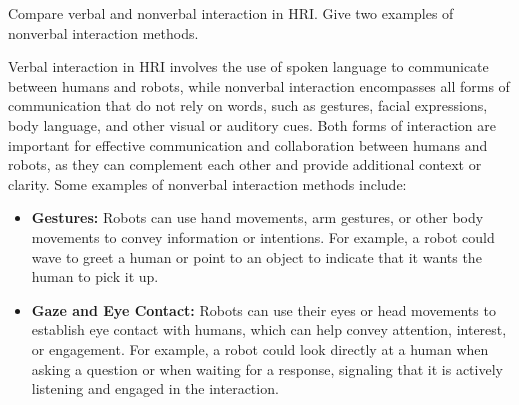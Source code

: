 \begin{ejercicio}
    Compare verbal and nonverbal interaction in HRI. Give two examples of nonverbal interaction methods.

    Verbal interaction in HRI involves the use of spoken language to communicate between humans and robots, while nonverbal interaction encompasses all forms of communication that do not rely on words, such as gestures, facial expressions, body language, and other visual or auditory cues. Both forms of interaction are important for effective communication and collaboration between humans and robots, as they can complement each other and provide additional context or clarity. Some examples of nonverbal interaction methods include:
    \begin{itemize}
        \item \textbf{Gestures:} Robots can use hand movements, arm gestures, or other body movements to convey information or intentions. For example, a robot could wave to greet a human or point to an object to indicate that it wants the human to pick it up.
        \item \textbf{Gaze and Eye Contact:} Robots can use their eyes or head movements to establish eye contact with humans, which can help convey attention, interest, or engagement. For example, a robot could look directly at a human when asking a question or when waiting for a response, signaling that it is actively listening and engaged in the interaction.
    \end{itemize}
\end{ejercicio}

